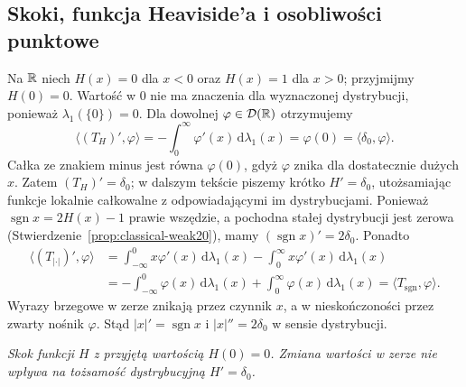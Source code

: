 \subsection{Skoki, funkcja Heaviside'a i osobliwości punktowe}

\begin{przyklad}
\label{ex:heaviside20}
Na $\mathbb R$ niech $H(x)=0$ dla $x<0$ oraz $H(x)=1$ dla $x>0$;
przyjmijmy $H(0)=0$. Wartość w $0$ nie ma znaczenia
dla wyznaczonej dystrybucji, ponieważ $\lambda_1(\{0\})=0$.
Dla dowolnej $\varphi\in\mathcal D(\mathbb R)$ otrzymujemy
\[
 \langle (T_H)',\varphi\rangle
 =-\int_0^\infty\varphi'(x)\,\mathrm d\lambda_1(x)
 =\varphi(0)=\langle\delta_0,\varphi\rangle.
\]
Całka ze znakiem minus jest równa $\varphi(0)$, gdyż $\varphi$ znika
dla dostatecznie dużych $x$.
Zatem $(T_H)'=\delta_0$; w dalszym tekście piszemy krótko
$H'=\delta_0$, utożsamiając funkcje lokalnie całkowalne
z odpowiadającymi im dystrybucjami.
Ponieważ $\operatorname{sgn}x=2H(x)-1$ prawie wszędzie,
a pochodna stałej dystrybucji jest zerowa
(Stwierdzenie~\ref{prop:classical-weak20}), mamy
$(\operatorname{sgn}x)'=2\delta_0$.
Ponadto
\[
\begin{aligned}
\langle(T_{|\cdot|})',\varphi\rangle
&=\int_{-\infty}^0 x\varphi'(x)\,\mathrm d\lambda_1(x)
 -\int_0^\infty x\varphi'(x)\,\mathrm d\lambda_1(x)\\
&=-\int_{-\infty}^0\varphi(x)\,\mathrm d\lambda_1(x)
 +\int_0^\infty\varphi(x)\,\mathrm d\lambda_1(x)
 =\langle T_{\operatorname{sgn}},\varphi\rangle .
\end{aligned}
\]
Wyrazy brzegowe w zerze znikają przez czynnik $x$,
a w nieskończoności przez zwarty nośnik $\varphi$.
Stąd $|x|'=\operatorname{sgn}x$ i $|x|''=2\delta_0$
w sensie dystrybucji.
\end{przyklad}

\begin{center}

\small\emph{Skok funkcji $H$ z przyjętą wartością $H(0)=0$.
Zmiana wartości w zerze nie wpływa na tożsamość dystrybucyjną
$H'=\delta_0$.}
\end{center}

